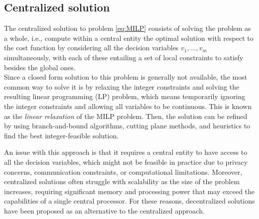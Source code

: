 \subsection{Centralized solution}
The centralized solution to problem \ref{eq:MILP} consists of solving the problem as a whole, i.e., compute within a central entity the optimal solution with respect to the cost function by considering all the decision variables $v_1, ..., v_m$ simultaneously, with each of these entailing a set of local constraints to satisfy besides the global ones. \\
Since a closed form solution to this problem is generally not available, the most common way to solve it is by relaxing the integer constraints and solving the resulting linear programming (LP) problem, which means temporarily ignoring the integer constraints and allowing all variables to be continuous. This is known as the \textit{linear relaxation} of the MILP problem. Then, the solution can be refined by using branch-and-bound algorithms, cutting plane methods, and heuristics to find the best integer-feasible solution.

An issue with this approach is that it requires a central entity to have access to all the decision variables, which might not be feasible in practice due to privacy concerns, communication constraints, or computational limitations. Moreover, centralized solutions often struggle with scalability as the size of the problem increases, requiring significant memory and processing power that may exceed the capabilities of a single central processor. For these reasons, decentralized solutions have been proposed as an alternative to the centralized approach.